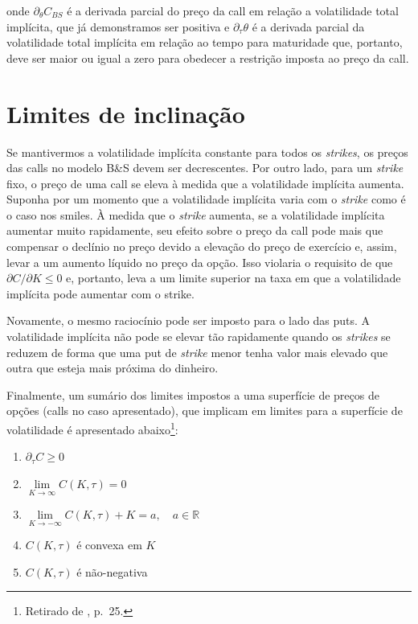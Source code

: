 \documentclass[]{book}
\providecommand{\tightlist}{%
  \setlength{\itemsep}{0pt}\setlength{\parskip}{0pt}}
\let\rmarkdownfootnote\footnote%
\def\footnote{\protect\rmarkdownfootnote}
\theoremstyle{definition}
\theoremstyle{definition}
\theoremstyle{definition}
\theoremstyle{remark}
\begin{document}
onde \(\partial_\theta C_{BS}\) é a derivada parcial do preço da call em
relação a volatilidade total implícita, que já demonstramos ser positiva
e \(\partial_\tau \theta\) é a derivada parcial da volatilidade total
implícita em relação ao tempo para maturidade que, portanto, deve ser
maior ou igual a zero para obedecer a restrição imposta ao preço da
call.

\section{Limites de inclinação}\label{limites-de-inclinacao}

Se mantivermos a volatilidade implícita constante para todos os
\emph{strikes}, os preços das calls no modelo B\&S devem ser
decrescentes. Por outro lado, para um \emph{strike} fixo, o preço de uma
call se eleva à medida que a volatilidade implícita aumenta. Suponha por
um momento que a volatilidade implícita varia com o \emph{strike} como é
o caso nos smiles. À medida que o \emph{strike} aumenta, se a
volatilidade implícita aumentar muito rapidamente, seu efeito sobre o
preço da call pode mais que compensar o declínio no preço devido a
elevação do preço de exercício e, assim, levar a um aumento líquido no
preço da opção. Isso violaria o requisito de que
\(\partial C /\partial K \leq 0\) e, portanto, leva a um limite superior
na taxa em que a volatilidade implícita pode aumentar com o strike.

Novamente, o mesmo raciocínio pode ser imposto para o lado das puts. A
volatilidade implícita não pode se elevar tão rapidamente quando os
\emph{strikes} se reduzem de forma que uma put de \emph{strike} menor
tenha valor mais elevado que outra que esteja mais próxima do dinheiro.

Finalmente, um sumário dos limites impostos a uma superfície de preços
de opções (calls no caso apresentado), que implicam em limites para a
superfície de volatilidade é apresentado abaixo\footnote{Retirado de
  \citet{Aurell2014}, p.~25.}:

\begin{enumerate}
\def\labelenumi{\arabic{enumi}.}
\tightlist
\item
  \(\partial_\tau C \geq 0\)
\item
  \(\lim\limits_{K\rightarrow\infty}C(K, \tau)=0\)
\item
  \(\lim\limits_{K\rightarrow-\infty}C(K, \tau)+K=a, \quad a \in \mathbb R\)
\item
  \(C(K, \tau)\) é convexa em \(K\)
\item
  \(C(K, \tau)\) é não-negativa
\end{enumerate}
\end{document}
